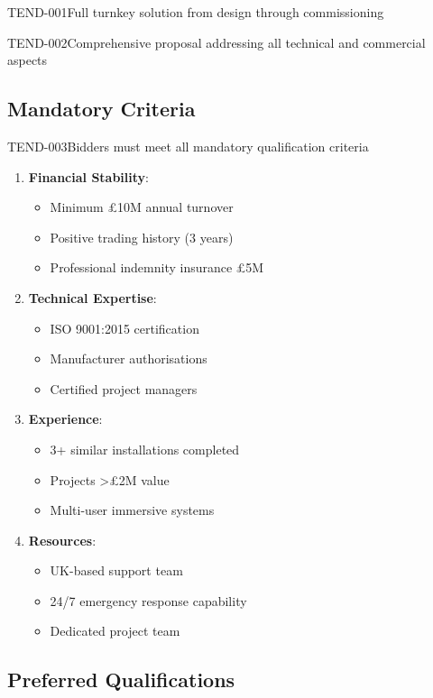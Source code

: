 \begin{requirement}{TEND-001}{Full turnkey solution from design through commissioning}
\begin{requirement}{TEND-002}{Comprehensive proposal addressing all technical and commercial aspects}
\subsection{Mandatory Criteria}

\begin{requirement}{TEND-003}{Bidders must meet all mandatory qualification criteria}

\begin{enumerate}
    \item \textbf{Financial Stability}:
        \begin{itemize}
            \item Minimum £10M annual turnover
            \item Positive trading history (3 years)
            \item Professional indemnity insurance £5M
        \end{itemize}

    \item \textbf{Technical Expertise}:
        \begin{itemize}
            \item ISO 9001:2015 certification
            \item Manufacturer authorisations
            \item Certified project managers
        \end{itemize}

    \item \textbf{Experience}:
        \begin{itemize}
            \item 3+ similar installations completed
            \item Projects >£2M value
            \item Multi-user immersive systems
        \end{itemize}

    \item \textbf{Resources}:
        \begin{itemize}
            \item UK-based support team
            \item 24/7 emergency response capability
            \item Dedicated project team
        \end{itemize}
\end{enumerate}

\subsection{Preferred Qualifications}


\end{requirement}
\end{requirement}
\end{requirement}
